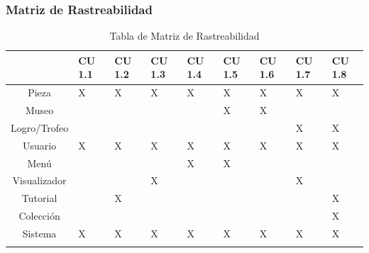 \subsubsection{Matriz de Rastreabilidad}
\begin{longtable}{|c|p{1.3cm}|p{1.3cm}|p{1.3cm}|p{1.3cm}|p{1.3cm}|p{1.3cm}|p{1.3cm}|p{1.3cm}|}
\hline 
 & CU 1.1 & CU 1.2 & CU 1.3 & CU 1.4 & CU 1.5 & CU 1.6 & CU 1.7 & CU 1.8\\ 
\hline 
Pieza & X & X & X & X & X & X & X & X \\ 
\hline 
Museo &   &   &   &   & X & X &   &   \\ 
\hline
Logro/Trofeo &   &   &   &   &   &   & X & X \\ 
\hline
Usuario & X & X & X & X & X & X & X & X \\ 
\hline
Menú &   &   &   & X & X &   &   & \\ 
\hline
Visualizador &   &   & X &  &  	 &   & X & \\ 
\hline
Tutorial  &   & X &   &   &   &   &   & X \\ 
\hline
Colección &  &   &   &   &   &   &   & X \\ 
\hline
Sistema & X & X & X & X & X & X & X & X \\ 
\hline
\caption{Tabla de Matriz de Rastreabilidad}
\label{tab29}\\
\end{longtable}
